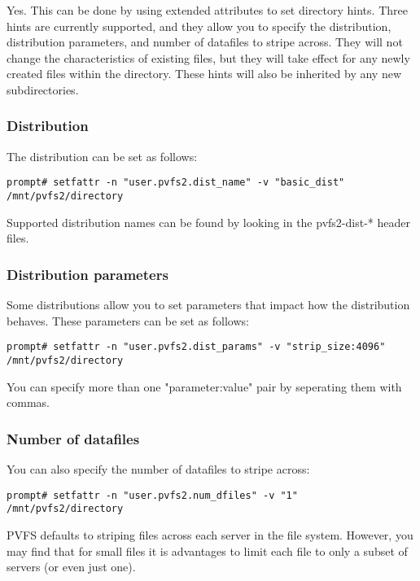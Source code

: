 \documentclass[11pt,letterpaper]{article}
\begin{document}
Yes.  This can be done by using extended attributes to set directory
hints.  Three hints are currently supported, and they allow you to specify
the distribution, distribution parameters, and number of datafiles to
stripe across.  They will not change the characteristics of existing
files, but they will take effect for any newly created files within the
directory.  These hints will also be inherited by any new
subdirectories.

\subsubsection{Distribution}

The distribution can be set as follows:

\begin{verbatim}
prompt# setfattr -n "user.pvfs2.dist_name" -v "basic_dist" /mnt/pvfs2/directory
\end{verbatim}

Supported distribution names can be found by looking in the pvfs2-dist-*
header files.

\subsubsection{Distribution parameters}

Some distributions allow you to set parameters that impact how the
distribution behaves.  These parameters can be set as follows:

\begin{verbatim}
prompt# setfattr -n "user.pvfs2.dist_params" -v "strip_size:4096" /mnt/pvfs2/directory
\end{verbatim}

You can specify more than one "parameter:value" pair by seperating them with
commas.

\subsubsection{Number of datafiles}

You can also specify the number of datafiles to stripe across: 

\begin{verbatim}
prompt# setfattr -n "user.pvfs2.num_dfiles" -v "1" /mnt/pvfs2/directory
\end{verbatim}

PVFS defaults to striping files across each server in the file system.
However, you may find that for small files it is advantages to limit each
file to only a subset of servers (or even just one).
\end{document}
